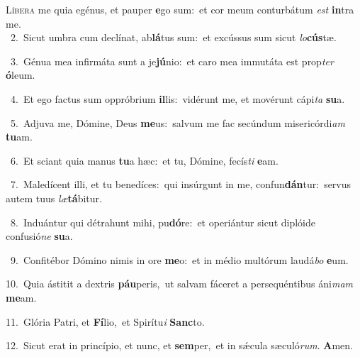 \lettrine{\initial\textcolor{\initialcolor}{L}}{íbera} me quia egénus, et pauper \textbf{e}\-go sum:~\star et cor meum conturbátum \textit{est} \textbf{in}\-tra me.\\
{\numbfont\textcolor{\numbcolor}{~2.}}~Sicut umbra cum declínat, ab\-\textbf{lá}\-tus sum:~\star et excússus sum sicut \textit{lo}\-\textbf{cús}tæ.\par
{\numbfont\textcolor{\numbcolor}{~3.}}~Génua mea infirmáta sunt a je\-\textbf{jú}\-nio:~\star et caro mea immutáta est prop\textit{ter} \textbf{ó}\-leum.\par
{\numbfont\textcolor{\numbcolor}{~4.}}~Et ego factus sum oppróbrium \textbf{il}\-lis:~\star vidérunt me, et movérunt cápi\textit{ta} \textbf{su}\-a.\par
{\numbfont\textcolor{\numbcolor}{~5.}}~Adjuva me, Dómine, Deus \textbf{me}\-us:~\star salvum me fac secúndum misericórdi\textit{am} \textbf{tu}\-am.\par
{\numbfont\textcolor{\numbcolor}{~6.}}~Et sciant quia manus \textbf{tu}\-a hæc:~\star et tu, Dómine, fecís\textit{ti} \textbf{e}\-am.\par
{\numbfont\textcolor{\numbcolor}{~7.}}~Maledícent illi, et tu benedíces:~\dagger qui insúrgunt in me, confun\-\textbf{dán}\-tur:~\star servus autem tuus \textit{læ}\-\textbf{tá}bitur.\par
{\numbfont\textcolor{\numbcolor}{~8.}}~Induántur qui détrahunt mihi, pu\-\textbf{dó}\-re:~\star et operiántur sicut diplóide confusió\textit{ne} \textbf{su}\-a.\par
{\numbfont\textcolor{\numbcolor}{~9.}}~Confitébor Dómino nimis in ore \textbf{me}\-o:~\star et in médio multórum laudá\textit{bo} \textbf{e}\-um.\par
{\numbfont\textcolor{\numbcolor}{10.}}~Quia ástitit a dextris \textbf{páu}\-peris,~\star ut salvam fáceret a persequéntibus áni\textit{mam} \textbf{me}\-am.\par
{\numbfont\textcolor{\numbcolor}{11.}}~Glória Patri, et \textbf{Fí}\-lio,~\star et Spirítu\textit{i} \textbf{Sanc}\-to.\par
{\numbfont\textcolor{\numbcolor}{12.}}~Sicut erat in princípio, et nunc, et \textbf{sem}\-per,~\star et in sǽcula sæculó\-\textit{rum}\-. \textbf{A}\-men.\par
